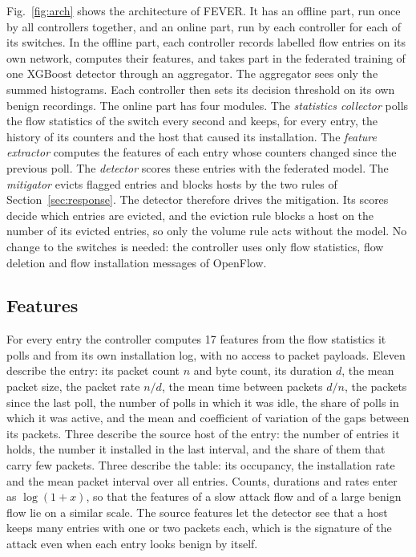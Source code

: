 \documentclass[conference]{IEEEtran}
\begin{document}
Fig.~\ref{fig:arch} shows the architecture of FEVER. It has an offline part, run once by all controllers
together, and an online part, run by each controller for each of its switches. In the offline part,
each controller records labelled flow entries on its own network, computes their features, and takes
part in the federated training of one XGBoost detector through an aggregator. The aggregator sees only
the summed histograms. Each controller then sets its decision threshold on its own benign recordings.
The online part has four modules. The \textit{statistics collector} polls the flow statistics of the
switch every second and keeps, for every entry, the history of its counters and the host that caused
its installation. The \textit{feature extractor} computes the features of each entry whose counters
changed since the previous poll. The \textit{detector} scores these entries with the federated model.
The \textit{mitigator} evicts flagged entries and blocks hosts by the two rules of
Section~\ref{sec:response}. The detector therefore drives the mitigation. Its scores decide which
entries are evicted, and the eviction rule blocks a host on the number of its evicted entries, so only
the volume rule acts without the model. No change to the switches is needed: the controller uses only flow
statistics, flow deletion and flow installation messages of OpenFlow.

\subsection{Features}

For every entry the controller computes 17 features from the flow statistics it polls and from its own
installation log, with no access to packet payloads. Eleven describe the entry: its packet count $n$ and
byte count, its duration $d$, the mean packet size, the packet rate $n/d$, the mean time between packets
$d/n$, the packets since the last poll, the number of polls in which it was idle, the share of polls in
which it was active, and the mean and coefficient of variation of the gaps between its packets. Three
describe the source host of the entry: the number of entries it holds, the number it installed in the
last interval, and the share of them that carry few packets. Three describe the table: its occupancy,
the installation rate and the mean packet interval over all entries. Counts, durations and rates enter
as $\log(1 + x)$, so that the features of a slow attack flow and of a large benign flow lie on a similar
scale. The source features let the detector see that a host keeps many entries with one or two packets
each, which is the signature of the attack even when each entry looks benign by itself.
\end{document}
